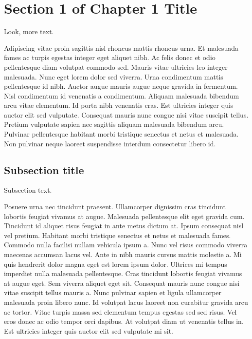 \documentclass[11pt,a4paper,onecolumn]{report}
\begin{document}
\section{Section 1 of Chapter 1 Title}

Look, more text.

Adipiscing vitae proin sagittis nisl rhoncus mattis rhoncus urna. Et malesuada fames ac turpis egestas integer eget aliquet nibh. Ac felis donec et odio pellentesque diam volutpat commodo sed. Mauris vitae ultricies leo integer malesuada. Nunc eget lorem dolor sed viverra. Urna condimentum mattis pellentesque id nibh. Auctor augue mauris augue neque gravida in fermentum. Nisl condimentum id venenatis a condimentum. Aliquam malesuada bibendum arcu vitae elementum. Id porta nibh venenatis cras. Est ultricies integer quis auctor elit sed vulputate. Consequat mauris nunc congue nisi vitae suscipit tellus. Pretium vulputate sapien nec sagittis aliquam malesuada bibendum arcu. Pulvinar pellentesque habitant morbi tristique senectus et netus et malesuada. Non pulvinar neque laoreet suspendisse interdum consectetur libero id.

\subsection{Subsection title}

Subsection text.

Posuere urna nec tincidunt praesent. Ullamcorper dignissim cras tincidunt lobortis feugiat vivamus at augue. Malesuada pellentesque elit eget gravida cum. Tincidunt id aliquet risus feugiat in ante metus dictum at. Ipsum consequat nisl vel pretium. Habitant morbi tristique senectus et netus et malesuada fames. Commodo nulla facilisi nullam vehicula ipsum a. Nunc vel risus commodo viverra maecenas accumsan lacus vel. Ante in nibh mauris cursus mattis molestie a. Mi quis hendrerit dolor magna eget est lorem ipsum dolor. Ultrices mi tempus imperdiet nulla malesuada pellentesque. Cras tincidunt lobortis feugiat vivamus at augue eget. Sem viverra aliquet eget sit. Consequat mauris nunc congue nisi vitae suscipit tellus mauris a. Nunc pulvinar sapien et ligula ullamcorper malesuada proin libero nunc. Id volutpat lacus laoreet non curabitur gravida arcu ac tortor. Vitae turpis massa sed elementum tempus egestas sed sed risus. Vel eros donec ac odio tempor orci dapibus. At volutpat diam ut venenatis tellus in. Est ultricies integer quis auctor elit sed vulputate mi sit.


\appendix
\end{document}
